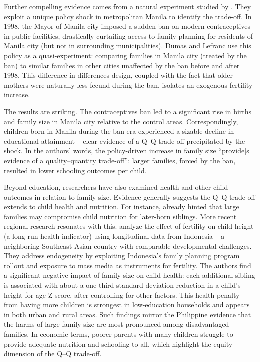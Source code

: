 \documentclass[]{AEA}
\begin{document}
Further compelling evidence comes from a natural experiment studied by
\citet{dumas2019sex}. They exploit a unique policy shock in metropolitan
Manila to identify the trade-off. In 1998, the Mayor of Manila city
imposed a sudden ban on modern contraceptives in public facilities,
drastically curtailing access to family planning for residents of Manila
city (but not in surrounding municipalities). Dumas and Lefranc use this
policy as a quasi-experiment: comparing families in Manila city (treated
by the ban) to similar families in other cities unaffected by the ban
before and after 1998. This difference-in-differences design, coupled
with the fact that older mothers were naturally less fecund during the
ban, isolates an exogenous fertility increase.

The results are striking. The contraceptives ban led to a significant
rise in births and family size in Manila city relative to the control
areas. Correspondingly, children born in Manila during the ban era
experienced a sizable decline in educational attainment -- clear
evidence of a Q--Q trade-off precipitated by the shock. In the authors'
words, the policy-driven increase in family size ``provide{[}s{]}
evidence of a quality--quantity trade-off'': larger families, forced by
the ban, resulted in lower schooling outcomes per child.

Beyond education, researchers have also examined health and other child
outcomes in relation to family size. Evidence generally suggests the
Q--Q trade-off extends to child health and nutrition. For instance,
\citet{horton1986child} already hinted that large families may
compromise child nutrition for later-born siblings. More recent regional
research resonates with this. \citet{hatton2018fertility} analyze the
effect of fertility on child height (a long-run health indicator) using
longitudinal data from Indonesia -- a neighboring Southeast Asian
country with comparable developmental challenges. They address
endogeneity by exploiting Indonesia's family planning program rollout
and exposure to mass media as instruments for fertility. The authors
find a significant negative impact of family size on child health: each
additional sibling is associated with about a one-third standard
deviation reduction in a child's height-for-age Z-score, after
controlling for other factors. This health penalty from having more
children is strongest in low-education households and appears in both
urban and rural areas. Such findings mirror the Philippine evidence that
the harms of large family size are most pronounced among disadvantaged
families. In economic terms, poorer parents with many children struggle
to provide adequate nutrition and schooling to all, which highlight the
equity dimension of the Q--Q trade-off.
\end{document}
